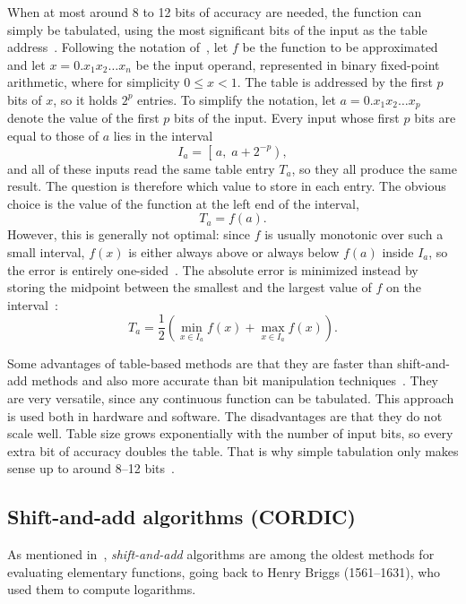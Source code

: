 When at most around 8 to 12 bits of accuracy are needed, the function can simply be tabulated, using the most significant bits of the input as the table address~\cite{muller2020}. Following the notation of~\cite{muller2020}, let $f$ be the function to be approximated and let $x = 0.x_{1}x_{2}\dots x_{n}$ be the input operand, represented in binary fixed-point arithmetic, where for simplicity $0 \le x < 1$.
The table is addressed by the first $p$ bits of $x$, so it holds $2^{p}$ entries.
To simplify the notation, let $a = 0.x_{1}x_{2}\dots x_{p}$ denote the value of the first $p$ bits of the input. Every input whose first $p$ bits are equal to those of $a$ lies in the interval
\begin{equation}
  I_{a} = \left[\, a,\; a + 2^{-p} \right),
  \label{eq:tab-interval}
\end{equation}
and all of these inputs read the same table entry $T_{a}$, so they all produce the same result.
The question is therefore which value to store in each entry.
The obvious choice is the value of the function at the left end of the interval,
\begin{equation}
  T_{a} = f(a).
  \label{eq:tab-naive}
\end{equation}
However, this is generally not optimal: since $f$ is usually monotonic over such a small interval, $f(x)$ is either always above or always below $f(a)$ inside $I_{a}$, so the error is entirely one-sided~\cite{muller2020}.
The absolute error is minimized instead by storing the midpoint between the smallest and the largest value of $f$ on the interval~\cite{muller2020}:
\begin{equation}
  T_{a} = \frac{1}{2}\left( \min_{x \in I_{a}} f(x) + \max_{x \in I_{a}} f(x) \right).
  \label{eq:tab-optimal}
\end{equation}

Some advantages of table-based methods are that they are faster than shift-and-add methods and also more accurate than bit manipulation techniques~\cite{muller2020}.
They are very versatile, since any continuous function can be tabulated. This approach is used both in hardware and software.
The disadvantages are that they do not scale well. Table size grows exponentially with the number of input bits, so every extra bit of accuracy doubles the table.
That is why simple tabulation only makes sense up to around 8--12 bits~\cite{muller2020}.

\subsection{Shift-and-add algorithms (CORDIC)}
\label{sec:cordic}
As mentioned in~\cite{muller2020}, \emph{shift-and-add} algorithms are among the
oldest methods for evaluating elementary functions, going back to Henry Briggs
(1561--1631), who used them to compute logarithms.

